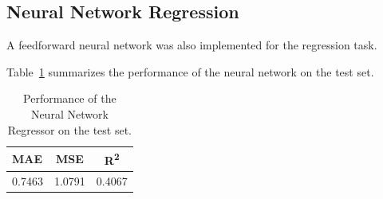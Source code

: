 
\subsection{Neural Network Regression}
A feedforward neural network was also implemented for the regression task.

Table~\ref{tab:nn_metrics} summarizes the performance of the neural network on the test set.
\begin{table}[h]
    \centering
    \begin{tabular}{lcc}
        \hline
        \textbf{MAE} & \textbf{MSE} & \textbf{R\textsuperscript{2}} \\
        \hline
        0.7463 & 1.0791 & 0.4067 \\
        \hline
    \end{tabular}
    \caption{Performance of the Neural Network Regressor on the test set.}
    \label{tab:nn_metrics}
\end{table}